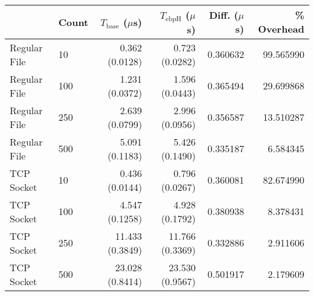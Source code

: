 \begin{tabular}{>{\ttfamily}llrrrr}
\toprule
\multicolumn{1}{l}{Type} & Count & $T_\text{base}$ ($\mu$s) & $T_\text{ebpH}$ ($\mu$s) &  Diff. ($\mu$s) &  \% Overhead \\
\midrule
            Regular File &    10 &           0.362 (0.0128) &           0.723 (0.0282) &        0.360632 &    99.565990 \\
            Regular File &   100 &           1.231 (0.0372) &           1.596 (0.0443) &        0.365494 &    29.699868 \\
            Regular File &   250 &           2.639 (0.0799) &           2.996 (0.0956) &        0.356587 &    13.510287 \\
            Regular File &   500 &           5.091 (0.1183) &           5.426 (0.1490) &        0.335187 &     6.584345 \\
              TCP Socket &    10 &           0.436 (0.0144) &           0.796 (0.0267) &        0.360081 &    82.674990 \\
              TCP Socket &   100 &           4.547 (0.1258) &           4.928 (0.1792) &        0.380938 &     8.378431 \\
              TCP Socket &   250 &          11.433 (0.3849) &          11.766 (0.3369) &        0.332886 &     2.911606 \\
              TCP Socket &   500 &          23.028 (0.8414) &          23.530 (0.9567) &        0.501917 &     2.179609 \\
\bottomrule
\end{tabular}
